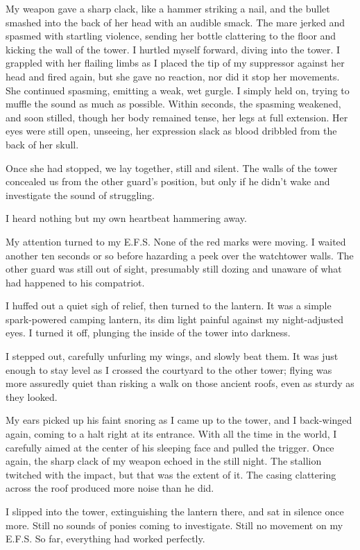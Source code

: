 My weapon gave a sharp clack, like a hammer striking a nail, and the bullet smashed into the back of her head with an audible smack. The mare jerked and spasmed with startling violence, sending her bottle clattering to the floor and kicking the wall of the tower. I hurtled myself forward, diving into the tower. I grappled with her flailing limbs as I placed the tip of my suppressor against her head and fired again, but she gave no reaction, nor did it stop her movements. She continued spasming, emitting a weak, wet gurgle. I simply held on, trying to muffle the sound as much as possible. Within seconds, the spasming weakened, and soon stilled, though her body remained tense, her legs at full extension. Her eyes were still open, unseeing, her expression slack as blood dribbled from the back of her skull.

Once she had stopped, we lay together, still and silent. The walls of the tower concealed us from the other guard’s position, but only if he didn’t wake and investigate the sound of struggling.

I heard nothing but my own heartbeat hammering away.

My attention turned to my E.F.S. None of the red marks were moving. I waited another ten seconds or so before hazarding a peek over the watchtower walls. The other guard was still out of sight, presumably still dozing and unaware of what had happened to his compatriot.

I huffed out a quiet sigh of relief, then turned to the lantern. It was a simple spark-powered camping lantern, its dim light painful against my night-adjusted eyes. I turned it off, plunging the inside of the tower into darkness.

I stepped out, carefully unfurling my wings, and slowly beat them. It was just enough to stay level as I crossed the courtyard to the other tower; flying was more assuredly quiet than risking a walk on those ancient roofs, even as sturdy as they looked.

My ears picked up his faint snoring as I came up to the tower, and I back-winged again, coming to a halt right at its entrance. With all the time in the world, I carefully aimed at the center of his sleeping face and pulled the trigger. Once again, the sharp clack of my weapon echoed in the still night. The stallion twitched with the impact, but that was the extent of it. The casing clattering across the roof produced more noise than he did.

I slipped into the tower, extinguishing the lantern there, and sat in silence once more. Still no sounds of ponies coming to investigate. Still no movement on my E.F.S. So far, everything had worked perfectly.

